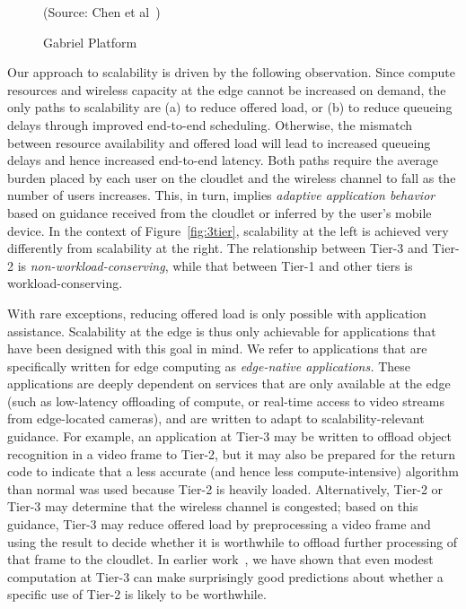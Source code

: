\begin{figure}
\begin{minipage}[b]{2.5in}
\begin{captiontext}
{\rm (Source: Chen et al~\cite{Chen2017})}
\end{captiontext}
\vspace{-0.1in}
\caption{\small Gabriel Platform}
\label{fig:gabriel}
\vspace{0.5in}
\end{minipage}
\vspace{-0.1in}
\end{figure}

Our approach to scalability is driven by the following observation.
Since compute resources and wireless capacity at the edge cannot be
increased on demand, the only paths to scalability are (a) to reduce
offered load, or (b) to reduce queueing delays through improved
end-to-end scheduling.  Otherwise, the mismatch between resource
availability and offered load will lead to increased queueing delays
and hence increased end-to-end latency.  Both paths require the
average burden placed by each user on the cloudlet and the wireless
channel to fall as the number of users increases.  This, in turn,
implies {\em adaptive application behavior} based on guidance received
from the cloudlet or inferred by the user's mobile device.  In the
context of Figure~\ref{fig:3tier}, scalability at the left is achieved
very differently from scalability at the right.  The relationship
between Tier-3 and Tier-2 is {\em non-workload-conserving}, while that
between Tier-1 and other tiers is workload-conserving.

With rare exceptions, reducing offered load is only possible with
application assistance.  Scalability at the edge is thus only
achievable for applications that have been designed with this goal in
mind.  We refer to applications that are specifically written for edge
computing as {\em edge-native applications.}  These applications are
deeply dependent on services that are only available at the edge (such
as low-latency offloading of compute, or real-time access to video
streams from edge-located cameras), and are written to adapt to
scalability-relevant guidance.  For example, an application at Tier-3
may be written to offload object recognition in a video frame to
Tier-2, but it may also be prepared for the return code to indicate
that a less accurate (and hence less compute-intensive) algorithm than
normal was used because Tier-2 is heavily loaded.  Alternatively,
Tier-2 or Tier-3 may determine that the wireless channel is congested;
based on this guidance, Tier-3 may reduce offered load by
preprocessing a video frame and using the result to decide whether it
is worthwhile to offload further processing of that frame to the
cloudlet.  In earlier work~\cite{Hu2015}, we have shown that even
modest computation at Tier-3 can make surprisingly good predictions
about whether a specific use of Tier-2 is likely to be worthwhile.

